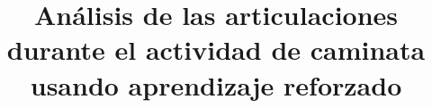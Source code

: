 \documentclass[review]{elsarticle}
\begin{document}
\begin{frontmatter}
	
	\title{Análisis de las articulaciones durante el actividad de caminata usando aprendizaje reforzado}
	
	
	
	
\end{frontmatter}

	
	
\end{document}
